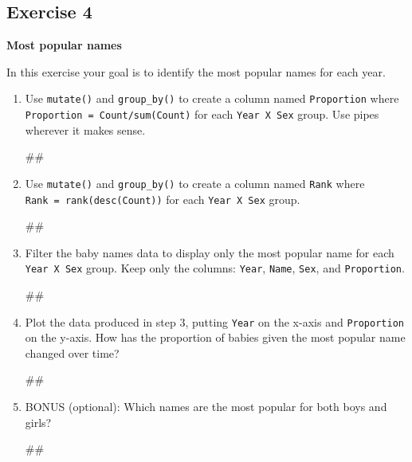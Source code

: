 \documentclass[]{book}
\newenvironment{Shaded}{\begin{snugshade}}{\end{snugshade}}
\newcommand{\NormalTok}[1]{#1}
\begin{document}
\subsection{Exercise 4}\label{exercise-4}

\textbf{Most popular names}

In this exercise your goal is to identify the most popular names for
each year.

\begin{enumerate}
\def\labelenumi{\arabic{enumi}.}
\item
  Use \texttt{mutate()} and \texttt{group\_by()} to create a column
  named \texttt{Proportion} where
  \texttt{Proportion\ =\ Count/sum(Count)} for each
  \texttt{Year\ X\ Sex} group. Use pipes wherever it makes sense.

\begin{Shaded}
\begin{Highlighting}[]
\NormalTok{##}
\end{Highlighting}
\end{Shaded}
\item
  Use \texttt{mutate()} and \texttt{group\_by()} to create a column
  named \texttt{Rank} where \texttt{Rank\ =\ rank(desc(Count))} for each
  \texttt{Year\ X\ Sex} group.

\begin{Shaded}
\begin{Highlighting}[]
\NormalTok{##}
\end{Highlighting}
\end{Shaded}
\item
  Filter the baby names data to display only the most popular name for
  each \texttt{Year\ X\ Sex} group. Keep only the columns:
  \texttt{Year}, \texttt{Name}, \texttt{Sex}, and \texttt{Proportion}.

\begin{Shaded}
\begin{Highlighting}[]
\NormalTok{##}
\end{Highlighting}
\end{Shaded}
\item
  Plot the data produced in step 3, putting \texttt{Year} on the x-axis
  and \texttt{Proportion} on the y-axis. How has the proportion of
  babies given the most popular name changed over time?

\begin{Shaded}
\begin{Highlighting}[]
\NormalTok{##}
\end{Highlighting}
\end{Shaded}
\item
  BONUS (optional): Which names are the most popular for both boys and
  girls?

\begin{Shaded}
\begin{Highlighting}[]
\NormalTok{##}
\end{Highlighting}
\end{Shaded}
\end{enumerate}
\end{document}
